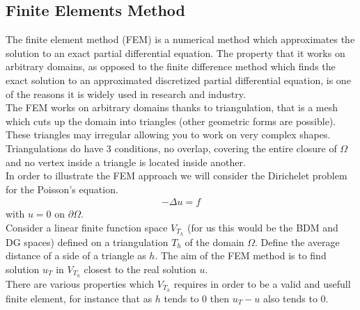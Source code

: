 \documentclass[11pt,twoside,a4paper]{article}
\begin{document}
\subsection{Finite Elements Method}
The finite element method (FEM) is a numerical method which approximates the solution to an exact partial differential equation. The property that it works on arbitrary domains, as opposed to the finite difference method which finds the exact solution to an approximated discretized partial differential equation, is one of the reasons it is widely used in research and industry.\\
The FEM works on arbitrary domains thanks to triangulation, that is a mesh which cuts up the domain into triangles (other geometric forms are possible). These triangles may irregular allowing you to work on very complex shapes.
Triangulations do have 3 conditions, no overlap, covering the entire closure of $\Omega$ and no vertex inside a triangle is located inside another.\\ 
In order to illustrate the FEM approach we will consider the Dirichelet problem for the Poisson's equation.
\begin{align}
-\Delta u = f 
\end{align}
with $u = 0$ on $\partial \Omega$.\\
Consider a linear finite function space $V_{T_h}$ (for us this would be the BDM and DG spaces) defined on a triangulation $T_h$ of the domain $\Omega$. Define the average distance of a side of a triangle as $h$. The aim of the FEM method is to find solution $u_T$ in $V_{T_h}$ closest to the real solution $u$.\\
There are various properties which $V_{T_h}$  requires in order to be a valid and usefull finite element, for instance that as $h$ tends to $0$ then $u_T - u$ also tends to $0$.\\
\end{document}

